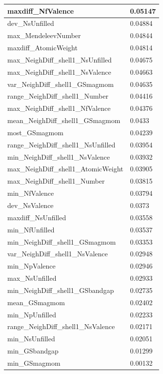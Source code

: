 \begin{longtable}{|l|l|}
maxdiff\_NfValence & 0.05147 \\ \hline
dev\_NsUnfilled & 0.04884 \\ \hline
max\_MendeleevNumber & 0.04844 \\ \hline
maxdiff\_AtomicWeight & 0.04814 \\ \hline
max\_NeighDiff\_shell1\_NsUnfilled & 0.04675 \\ \hline
max\_NeighDiff\_shell1\_NsValence & 0.04663 \\ \hline
var\_NeighDiff\_shell1\_GSmagmom & 0.04635 \\ \hline
range\_NeighDiff\_shell1\_Number & 0.04416 \\ \hline
max\_NeighDiff\_shell1\_NfValence & 0.04376 \\ \hline
mean\_NeighDiff\_shell1\_GSmagmom & 0.0433 \\ \hline
most\_GSmagmom & 0.04239 \\ \hline
range\_NeighDiff\_shell1\_NsUnfilled & 0.03954 \\ \hline
min\_NeighDiff\_shell1\_NsValence & 0.03932 \\ \hline
max\_NeighDiff\_shell1\_AtomicWeight & 0.03905 \\ \hline
max\_NeighDiff\_shell1\_Number & 0.03815 \\ \hline
min\_NfValence & 0.03794 \\ \hline
dev\_NsValence & 0.0373 \\ \hline
maxdiff\_NsUnfilled & 0.03558 \\ \hline
min\_NfUnfilled & 0.03537 \\ \hline
min\_NeighDiff\_shell1\_GSmagmom & 0.03353 \\ \hline
var\_NeighDiff\_shell1\_NsValence & 0.02948 \\ \hline
min\_NpValence & 0.02946 \\ \hline
max\_NsUnfilled & 0.02933 \\ \hline
min\_NeighDiff\_shell1\_GSbandgap & 0.02735 \\ \hline
mean\_GSmagmom & 0.02402 \\ \hline
min\_NpUnfilled & 0.02233 \\ \hline
range\_NeighDiff\_shell1\_NsValence & 0.02171 \\ \hline
min\_NsUnfilled & 0.02051 \\ \hline
min\_GSbandgap & 0.01299 \\ \hline
min\_GSmagmom & 0.00132 \\ \hline
\end{longtable}


